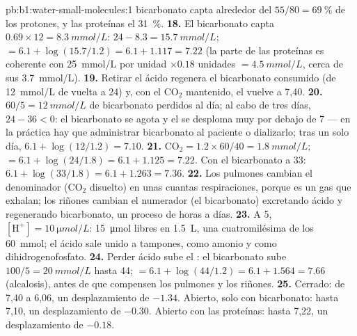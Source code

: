 \begin{solution}{pb:b1:water-small-molecules:1}
bicarbonato capta alrededor del $55/80 = \qty{69}{\%}$ de los protones, y
las proteínas el \qty{31}{\%}.
\textbf{18.} El bicarbonato capta $0.69\times 12 = \qty{8.3}{mmol/L}$:
$24 - 8.3 = \qty{15.7}{mmol/L}$;  $= 6.1 + \log(15.7/1.2) = 6.1 +
1.117 = 7.22$ (la parte de las proteínas es coherente con
\qty{25}{mmol/L} por unidad $\times 0.18$ unidades $= \qty{4.5}{mmol/L}$,
cerca de sus \qty{3.7}{mmol/L}).
\textbf{19.} Retirar el ácido regenera el bicarbonato consumido (de
\qty{12}{mmol/L} de vuelta a \qty{24}{}) y, con el $\mathrm{CO_2}$
mantenido, el  vuelve a 7,40.
\textbf{20.} $60/5 = \qty{12}{mmol/L}$ de bicarbonato perdidos al día; al
cabo de tres días, $24 - 36 < 0$: el bicarbonato se agota y el  se
desploma muy por debajo de 7 --- en la práctica hay que administrar
bicarbonato al paciente o dializarlo; tras un solo día,
$6.1 + \log(12/1.2) =
7.10$.
\textbf{21.} $\mathrm{CO_2} = 1.2\times 60/40 = \qty{1.8}{mmol/L}$;
 $= 6.1 + \log(24/1.8) = 6.1 + 1.125 = 7.22$. Con el bicarbonato a
\qty{33}{}: $6.1 + \log(33/1.8) = 6.1 + 1.263 = 7.36$.
\textbf{22.} Los pulmones cambian el denominador ($\mathrm{CO_2}$ disuelto)
en unas cuantas respiraciones, porque es un gas que exhalan; los riñones
cambian el numerador (el bicarbonato) excretando ácido y regenerando
bicarbonato, un proceso de horas a días.
\textbf{23.} A  5, $[\mathrm{H^+}] = \qty{10}{\micro mol/L}$: \qty{15}{\micro mol} libres en \qty{1.5}{L}, una cuatromilésima de los \qty{60}{mmol}; el ácido sale unido a tampones, como amonio y como dihidrogenofosfato.
\textbf{24.} Perder ácido sube el : el bicarbonato sube
$100/5 = \qty{20}{mmol/L}$ hasta \qty{44}{};  $= 6.1 + \log(44/1.2) =
6.1 + 1.564 = 7.66$ (alcalosis), antes de que compensen los pulmones y los
riñones.
\textbf{25.} Cerrado: de 7,40 a 6,06, un desplazamiento de $-1.34$.
Abierto, solo con bicarbonato: hasta 7,10, un desplazamiento de $-0.30$.
Abierto con las proteínas: hasta 7,22, un desplazamiento de $-0.18$.
\end{solution}

